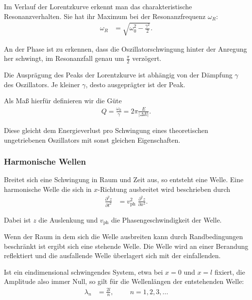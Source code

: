 Im Verlauf der Lorentzkurve erkennt man das charakteristische Resonanzverhalten.
Sie hat ihr Maximum bei der Resonanzfrequenz $\omega_R$:
\begin{align}
    \label{eq:Resonanzfrequenz}
    \omega_R &= \sqrt{\omega_0^2 - \frac{\gamma^2}{2}}.
\end{align}

An der Phase ist zu erkennen, dass die Oszillatorschwingung hinter der Anregung her schwingt, im Resonanzfall genau um $\frac{\pi}{2}$ verzögert.

Die Ausprägung des Peaks der Lorentzkurve ist abhängig von der Dämpfung $\gamma$ des Oszillators.
Je kleiner $\gamma$, desto ausgeprägter ist der Peak.

Als Maß hierfür definieren wir die Güte
\begin{align}
    \label{eq:Guete}
    Q = \frac{\omega_0}{\gamma} = 2 \pi \frac{E}{|\Delta E|}.
\end{align}

Diese gleicht dem Energieverlust pro Schwingung eines theoretischen ungetriebenen Oszillators mit sonst gleichen Eigenschaften.

\subsubsection*{Harmonische Wellen}

Breitet sich eine Schwingung in Raum und Zeit aus, so entsteht eine Welle.
Eine harmonische Welle die sich in $x$-Richtung ausbreitet wird beschrieben durch
\begin{align*}
    \frac{\partial^2 z}{\partial t^2} &= v_\mathrm{ph}^2 \; \frac{\partial^2 z}{\partial x^2}.
\end{align*}

Dabei ist $z$ die Auslenkung und $v_\mathrm{ph}$ die Phasengeschwindigkeit der Welle.

Wenn der Raum in dem sich die Welle ausbreiten kann durch Randbedingungen beschränkt ist ergibt sich eine stehende Welle.
Die Welle wird an einer Berandung reflektiert und die ausfallende Welle überlagert sich mit der einfallenden.

Ist ein eindimensional schwingendes System, etwa bei $x=0$ und $x=l$ fixiert, die Amplitude also immer Null, so gilt für die Wellenlängen der entstehenden Welle:
\begin{align}
    \lambda_n &= \frac{2l}{n}, \hspace{1cm} n=1,2,3,...
\end{align}


